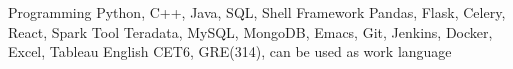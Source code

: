 \documentclass[11pt, a4paper, UTF8]{awesome-cv}
\begin{document}
%
\begin{cvskills}
  \cvskill
    {Programming} %
    {Python, C++, Java, SQL, Shell} %
  \cvskill
    {Framework} %
    {Pandas, Flask, Celery, React, Spark} %
  \cvskill
    {Tool} %
    {Teradata, MySQL, MongoDB, Emacs, Git, Jenkins, Docker, Excel, Tableau} %
  \cvskill
    {English} %
    {CET6, GRE(314), can be used as work language} %
\end{cvskills}



%
%
%
%
%


\end{document}

